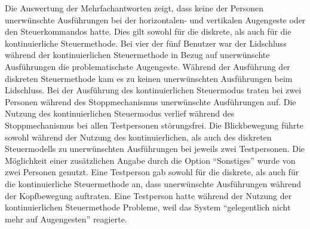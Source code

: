 Die Auswertung der Mehrfachantworten zeigt, dass keine der Personen unerwünschte Ausführungen bei der horizontalen- und vertikalen Augengeste oder den Steuerkommandos hatte. Dies gilt sowohl für die diskrete, als auch für die kontinuierliche Steuermethode. Bei vier der fünf Benutzer war der Lidschluss während der kontinuierlichen Steuermethode in Bezug auf unerwünschte Ausführungen die problematischste Augengeste. Während der Ausführung der diskreten Steuermethode kam es zu keinen unerwünschten Ausführungen beim Lidschluss. Bei der Ausführung des kontinuierlichen Steuermodus traten bei zwei Personen während des Stoppmechanismus unerwünschte Ausführungen auf. Die Nutzung des kontinuierlichen Steuermodus verlief während des Stoppmechanismus bei allen Testpersonen störungsfrei. Die Blickbewegung führte sowohl während der Nutzung des kontinuierlichen, als auch des diskreten Steuermodells zu unerwünschten Ausführungen bei jeweils zwei Testpersonen. 
Die Möglichkeit einer zusätzlichen Angabe durch die Option \enquote{Sonstiges} wurde von zwei Personen genutzt.
Eine Testperson gab sowohl für die diskrete, als auch für die kontinuierliche Steuermethode an, dass unerwünschte Ausführungen während der Kopfbewegung auftraten. Eine Testperson hatte während der Nutzung der kontinuierlichen Steuermethode Probleme, weil das System \enquote{gelegentlich nicht mehr auf Augengesten} reagierte. 


